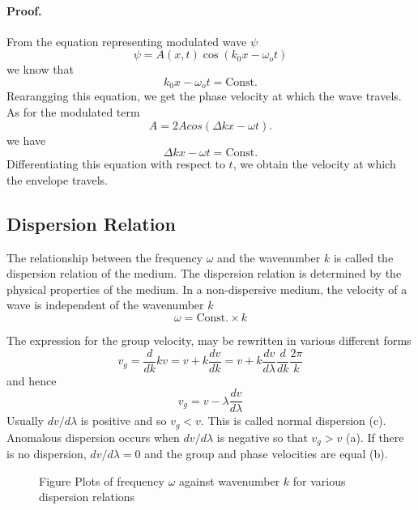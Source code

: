 \documentclass[../../../main.tex]{subfiles}
\begin{document}
\paragraph{Proof.} From the equation representing modulated wave $\psi$
\begin{equation*}
    \psi=A(x, t) \cos(k_0x - \omega_ot) 
\end{equation*}
we know that 
\begin{equation*}
    k_0x - \omega_ot=\text{Const.}
\end{equation*}
Rearangging this equation, we get the phase velocity at which the wave travels. As for the modulated term
\begin{equation*}
    A=2A cos( \Delta k x- \omega t).
\end{equation*}
we have 
\begin{equation*}
    \Delta k x- \omega t=\text{Const.}
\end{equation*}
Differentiating this equation with respect to $t$, we obtain the velocity at which the envelope travels.

\subsection*{Dispersion Relation}
The relationship between the frequency $\omega$ and the wavenumber $k$ is called the dispersion relation of the medium. The dispersion relation is determined by the physical properties of the medium. In a non-dispersive medium, the velocity of a wave is independent of the wavenumber $k$
\begin{equation*}
    \omega=\text{Const.}\times k
\end{equation*}

The expression for the group velocity, may be rewritten in various different forms
\begin{equation*}
    v_g=\frac{d}{dk}kv=v+k\frac{dv}{dk}=v+k\frac{dv}{d\lambda}\frac{d}{dk} \frac{2\pi}{k}
\end{equation*}
and hence
\begin{equation*}
    v_g=v-\lambda\frac{dv}{d\lambda}
\end{equation*}
Usually $dv/d\lambda$ is positive and so $v_g < v$. This is called normal dispersion (c). Anomalous dispersion occurs when $dv/d\lambda$ is negative so that $v_g > v$ (a). If there is no dispersion, $dv/d\lambda = 0$ and the group and phase velocities are equal (b).
\begin{figure*}
    \centering
    \caption*{Figure Plots of frequency $\omega$ against wavenumber $k$ for various dispersion relations}
\end{figure*}
\end{document}
